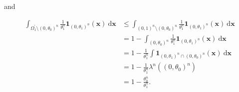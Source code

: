 \begin{solution}
\begin{enumerate}[label = (\alph*)]
    and

    \begin{align*}
        \int_{\Omega_1^\prime \setminus (0, \theta_0)^n}
            \frac{1}{\theta_1^n}
            \mathbf 1_{(0, \theta_1)^n}(\mathbf x)
            ~ \mathrm d \mathbf x
        & \leq
        \int_{(0, 1)^n \setminus (0, \theta_0)^n}
            \frac{1}{\theta_1^n}
            \mathbf 1_{(0, \theta_1)^n}(\mathbf x)
            ~ \mathrm d \mathbf x \\
        & =
        1
        - 
        \int_{(0, \theta_0)^n}
            \frac{1}{\theta_1^n}
            \mathbf 1_{(0, \theta_1)^n}(\mathbf x)
            ~ \mathrm d \mathbf x \\
        & =
        1
        - 
        \frac{1}{\theta_1^n}
        \int
            \mathbf 1_{(0, \theta_1)^n \cap (0, \theta_0)^n}(\mathbf x)
            ~ \mathrm d \mathbf x \\
        & =
        1
        - 
        \frac{1}{\theta_1^n}
        \lambda^n((0, \theta_0)^n) \\
        & =
        1 - \frac{\theta_0^n}{\theta_1^n}.
    \end{align*}

\end{enumerate}

\end{solution}

